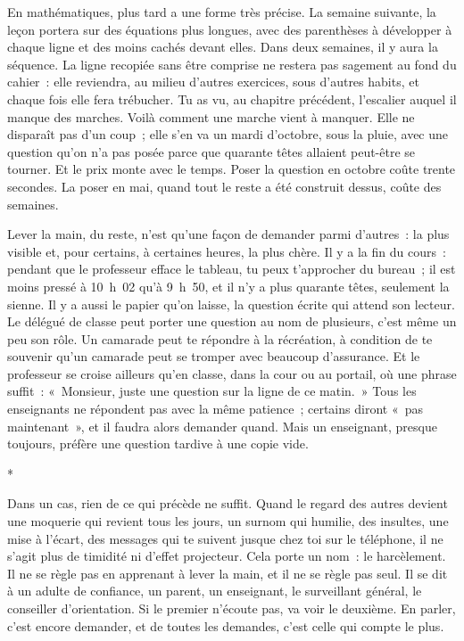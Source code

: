 \documentclass[10.5pt,twoside,openright]{book}
\newcommand{\asterisme}{\par\vspace{0.7em}\centerline{\color{gris}*\quad*\quad*}\vspace{0.7em}\par\noindent}
\begin{document}
En mathématiques, plus tard a une forme très précise. La semaine suivante, la leçon portera sur des équations plus longues, avec des parenthèses à développer à chaque ligne et des moins cachés devant elles. Dans deux semaines, il y aura la séquence. La ligne recopiée sans être comprise ne restera pas sagement au fond du cahier : elle reviendra, au milieu d’autres exercices, sous d’autres habits, et chaque fois elle fera trébucher. Tu as vu, au chapitre précédent, l’escalier auquel il manque des marches. Voilà comment une marche vient à manquer. Elle ne disparaît pas d’un coup ; elle s’en va un mardi d’octobre, sous la pluie, avec une question qu’on n’a pas posée parce que quarante têtes allaient peut-être se tourner. Et le prix monte avec le temps. Poser la question en octobre coûte trente secondes. La poser en mai, quand tout le reste a été construit dessus, coûte des semaines.

Lever la main, du reste, n’est qu’une façon de demander parmi d’autres : la plus visible et, pour certains, à certaines heures, la plus chère. Il y a la fin du cours : pendant que le professeur efface le tableau, tu peux t’approcher du bureau ; il est moins pressé à 10 h 02 qu’à 9 h 50, et il n’y a plus quarante têtes, seulement la sienne. Il y a aussi le papier qu’on laisse, la question écrite qui attend son lecteur. Le délégué de classe peut porter une question au nom de plusieurs, c’est même un peu son rôle. Un camarade peut te répondre à la récréation, à condition de te souvenir qu’un camarade peut se tromper avec beaucoup d’assurance. Et le professeur se croise ailleurs qu’en classe, dans la cour ou au portail, où une phrase suffit : « Monsieur, juste une question sur la ligne de ce matin. » Tous les enseignants ne répondent pas avec la même patience ; certains diront « pas maintenant », et il faudra alors demander quand. Mais un enseignant, presque toujours, préfère une question tardive à une copie vide.

\asterisme

Dans un cas, rien de ce qui précède ne suffit. Quand le regard des autres devient une moquerie qui revient tous les jours, un surnom qui humilie, des insultes, une mise à l’écart, des messages qui te suivent jusque chez toi sur le téléphone, il ne s’agit plus de timidité ni d’effet projecteur. Cela porte un nom : le harcèlement. Il ne se règle pas en apprenant à lever la main, et il ne se règle pas seul. Il se dit à un adulte de confiance, un parent, un enseignant, le surveillant général, le conseiller d’orientation. Si le premier n’écoute pas, va voir le deuxième. En parler, c’est encore demander, et de toutes les demandes, c’est celle qui compte le plus.
\end{document}
